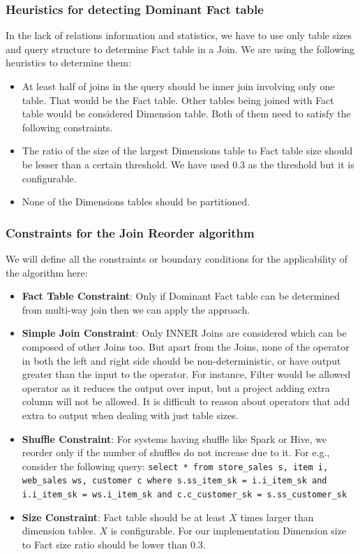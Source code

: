 \subsubsection{Heuristics for detecting Dominant Fact table}
In the lack of relations information and statistics, we have to use only table sizes and query structure to determine Fact table in a Join. We are using the following heuristics to determine them:

\begin{itemize}
\item At least half of joins in the query should be inner join involving only one table. That would be the Fact table. Other tables being joined with Fact table would be considered Dimension table. Both of them need to satisfy the following constraints.
\item The ratio of the size of the largest Dimensions table to Fact table size should be lesser than a certain threshold. We have used 0.3 as the threshold but it is configurable.
\item None of the Dimensions tables should be partitioned.
\end{itemize}

\subsubsection{Constraints for the Join Reorder algorithm}
We will define all the constraints or boundary conditions for the applicability of the algorithm here:

\begin{itemize}
\item \textbf{Fact Table Constraint}: Only if Dominant Fact table can be determined from multi-way join then we can apply the approach.
\item \textbf{Simple Join Constraint}: Only INNER Joins are considered which can be composed of other Joins too. But apart from the Joins, none of the operator in both the left and right side should be non-deterministic, or have output greater than the input to the operator. For instance, Filter would be allowed operator as it reduces the output over input, but a project adding extra column will not be allowed. It is difficult to reason about operators that add extra to output when dealing with just table sizes.
\item \textbf{Shuffle Constraint}: For systems having shuffle like Spark or Hive, we reorder only if the number of shuffles do not increase due to it. For e.g., consider the following query: \texttt{select * from store\_sales s, item i, web\_sales ws, customer c where s.ss\_item\_sk = i.i\_item\_sk and i.i\_item\_sk = ws.i\_item\_sk and c.c\_customer\_sk = s.ss\_customer\_sk}
\item \textbf{Size Constraint}: Fact table should be at least $X$ times larger than dimension tables. $X$ is configurable. For our implementation Dimension size to Fact size  ratio should be lower than 0.3.
\end{itemize}


